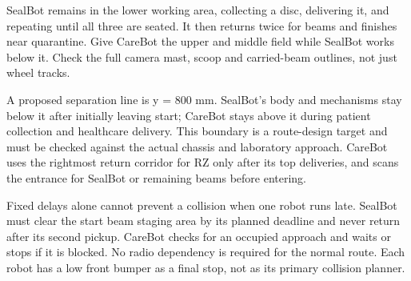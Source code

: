 \documentclass[10pt,a4paper]{article}
\begin{document}
SealBot remains in the lower working area, collecting a disc, delivering it, and repeating until all three are seated. It then returns twice for beams and finishes near quarantine. Give CareBot the upper and middle field while SealBot works below it. Check the full camera mast, scoop and carried-beam outlines, not just wheel tracks.

A proposed separation line is y = 800 mm. SealBot's body and mechanisms stay below it after initially leaving start; CareBot stays above it during patient collection and healthcare delivery. This boundary is a route-design target and must be checked against the actual chassis and laboratory approach. CareBot uses the rightmost return corridor for RZ only after its top deliveries, and scans the entrance for SealBot or remaining beams before entering.

Fixed delays alone cannot prevent a collision when one robot runs late. SealBot must clear the start beam staging area by its planned deadline and never return after its second pickup. CareBot checks for an occupied approach and waits or stops if it is blocked. No radio dependency is required for the normal route. Each robot has a low front bumper as a final stop, not as its primary collision planner.
\end{document}
